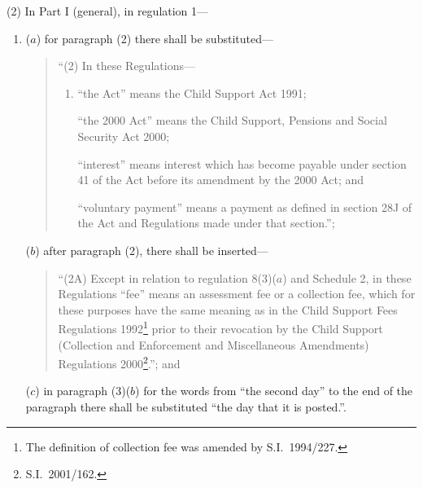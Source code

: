 \documentclass[12pt,a4paper]{article}
\begin{document}
(2) In Part I (general), in regulation 1—
\begin{enumerate}\item[]
($a$) for paragraph (2) there shall be substituted—
\begin{quotation}
“(2) In these Regulations—
\begin{enumerate}\item[]
“the Act” means the Child Support Act 1991;

“the 2000 Act” means the Child Support, Pensions and Social Security Act 2000;

“interest” means interest which has become payable under section 41 of the Act before its amendment by the 2000 Act; and

“voluntary payment” means a payment as defined in section 28J of the Act and Regulations made under that section.”;
\end{enumerate}
\end{quotation}

($b$) after paragraph (2), there shall be inserted—
\begin{quotation}
“(2A) Except in relation to regulation 8(3)($a$)  and Schedule 2, in these Regulations “fee” means an assessment fee or a collection fee, which for these purposes have the same meaning as in the Child Support Fees Regulations 1992\footnote{The definition of collection fee was amended by S.I.\ 1994/227.} prior to their revocation by the Child Support (Collection and Enforcement and Miscellaneous Amendments) Regulations 2000\footnote{S.I.\ 2001/162.}.”; and
\end{quotation}

($c$) in paragraph (3)($b$)  for the words from “the second day” to the end of the paragraph there shall be substituted “the day that it is posted.”.
\end{enumerate}
\end{document}
